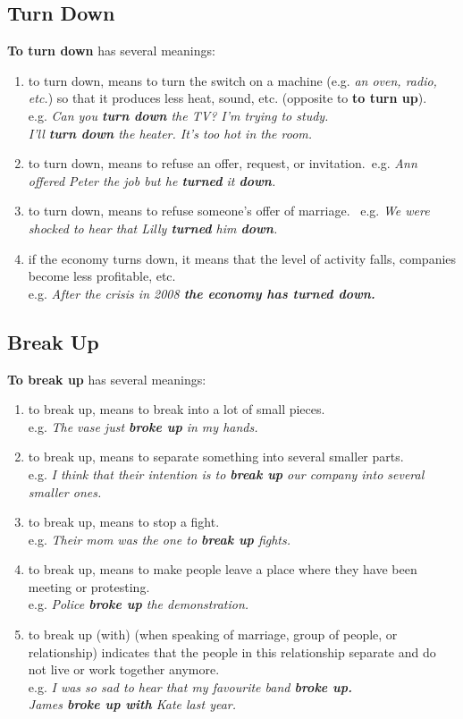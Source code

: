 \documentclass[hidelinks,10pt,a4paper]{article}
\begin{document}
\subsection{Turn Down}
\textbf{To turn down} has several meanings:
\begin{enumerate}[label=(\alph*)]
	\item to turn down, means to turn the switch on a machine (e.g. \textit{an oven, radio, etc.}) so that it produces less heat, sound, etc. (opposite to \textbf{to turn up}). \\
		e.g. \textit{Can you \textbf{turn down} the TV? I'm trying to study.\\
		I'll \textbf{turn down} the heater. It's too hot in the room. }
	\item to turn down, means to refuse an offer, request, or invitation.\
		e.g. \textit{Ann offered Peter the job but he \textbf{turned} it \textbf{down}.}
	\item to turn down, means to refuse someone's offer of marriage. \
		e.g. \textit{We were shocked to hear that Lilly \textbf{turned} him \textbf{down}.}
	\item if the economy turns down, it means that the level of activity falls, companies become less profitable, etc. \\
		e.g. \textit{After the crisis in 2008 \textbf{the economy has turned down.} }
\end{enumerate}

\subsection{Break Up}
\textbf{To break up} has several meanings:
\begin{enumerate}[label=(\alph*)]
	\item to break up, means to break into a lot of small pieces. \\
		e.g. \textit{The vase just \textbf{broke up} in my hands.}
	\item to break up, means to separate something into several smaller parts. \\
		e.g. \textit{I think that their intention is to \textbf{break up} our company into several smaller ones. }
	\item to break up, means to stop a fight. \\
		e.g. \textit{Their mom was the one to \textbf{break up} fights.}
	\item to break up, means to make people leave a place where they have been meeting or protesting. \\
		e.g. \textit{Police \textbf{broke up} the demonstration. }
	\item to break up (with) (when speaking of marriage, group of people, or relationship) indicates that the people in this relationship separate and do not live or work together anymore. \\
		e.g. \textit{I was so sad to hear that my favourite band \textbf{broke up.}\\
		James \textbf{broke up with} Kate last year. }
\end{enumerate}
\end{document}
